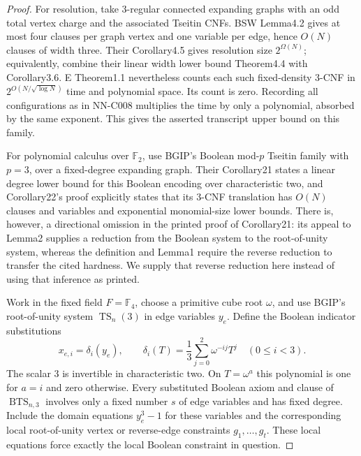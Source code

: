 \begin{proof}
For resolution, take 3-regular connected expanding graphs with an odd total vertex charge and the associated Tseitin CNFs. BSW Lemma4.2 gives at most four clauses per graph vertex and one variable per edge, hence $O(N)$ clauses of width three. Their Corollary4.5 gives resolution size $2^{\Omega(N)}$; equivalently, combine their linear width lower bound Theorem4.4 with Corollary3.6. E Theorem1.1 nevertheless counts each such fixed-density 3-CNF in $2^{O(N/\sqrt{\log N})}$ time and polynomial space. Its count is zero. Recording all configurations as in NN-C008 multiplies the time by only a polynomial, absorbed by the same exponent. This gives the asserted transcript upper bound on this family.

For polynomial calculus over $\mathbb F_2$, use BGIP's Boolean mod-$p$ Tseitin family with $p=3$, over a fixed-degree expanding graph. Their Corollary21 states a linear degree lower bound for this Boolean encoding over characteristic two, and Corollary22's proof explicitly states that its 3-CNF translation has $O(N)$ clauses and variables and exponential monomial-size lower bounds. There is, however, a directional omission in the printed proof of Corollary21: its appeal to Lemma2 supplies a reduction from the Boolean system to the root-of-unity system, whereas the definition and Lemma1 require the reverse reduction to transfer the cited hardness. We supply that reverse reduction here instead of using that inference as printed.

Work in the fixed field $F=\mathbb F_4$, choose a primitive cube root $\omega$, and use BGIP's root-of-unity system $\operatorname{TS}_n(3)$ in edge variables $y_e$. Define the Boolean indicator substitutions
\[
 x_{e,i}=\delta_i(y_e),\qquad
 \delta_i(T)=\frac13\sum_{j=0}^{2}\omega^{-ij}T^j
 \quad(0\leq i<3).
\]
The scalar $3$ is invertible in characteristic two. On $T=\omega^a$ this polynomial is one for $a=i$ and zero otherwise. Every substituted Boolean axiom and clause of $\operatorname{BTS}_{n,3}$ involves only a fixed number $s$ of edge variables and has fixed degree. Include the domain equations $y_e^3-1$ for these variables and the corresponding local root-of-unity vertex or reverse-edge constraints $g_1,\ldots,g_t$. These local equations force exactly the local Boolean constraint in question.


\end{proof}
